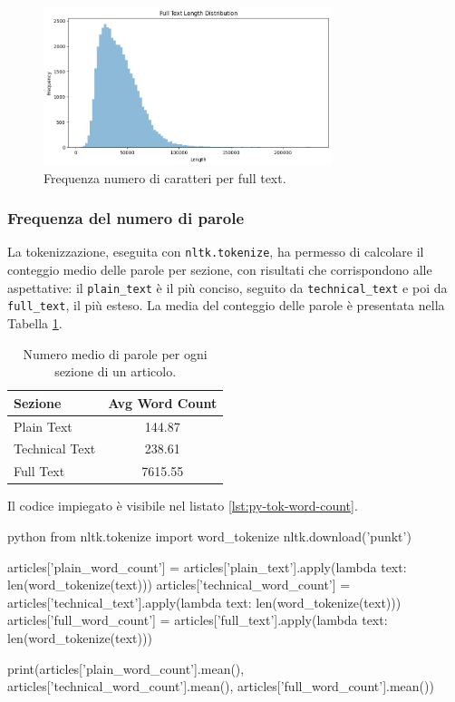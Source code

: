 \documentclass[12pt,a4paper,twoside,openright]{book}
\begin{document}
\begin{figure}
    \centering
    \includegraphics[width=0.75\textwidth]{images/full_length_distrib.png}
    \caption{Frequenza numero di caratteri per full text.}
    \label{fig:hist_full}
\end{figure}


\subsubsection{Frequenza del numero di parole}
La tokenizzazione, eseguita con \texttt{nltk.tokenize}, ha permesso di calcolare il conteggio medio delle parole per sezione, con risultati che corrispondono alle aspettative: il \texttt{plain\_text} è il più conciso, seguito da \texttt{technical\_text} e poi da \texttt{full\_text}, il più esteso. La media del conteggio delle parole è presentata nella Tabella \ref{tab:avg_word_count}.

\begin{table}
\centering
\begin{tabular}{|l|c|}
\hline
Sezione         & Avg Word Count \\ \hline
Plain Text      & 144.87 \\ \hline
Technical Text  & 238.61 \\ \hline
Full Text       & 7615.55 \\ \hline
\end{tabular}
\caption{Numero medio di parole per ogni sezione di un articolo.}
\label{tab:avg_word_count}
\end{table}

Il codice impiegato è visibile nel listato \ref{lst:py-tok-word-count}.

\begin{customcode}   
\begin{mintedbox}{python}
from nltk.tokenize import word_tokenize
nltk.download('punkt')

articles['plain_word_count'] = articles['plain_text'].apply(lambda text: len(word_tokenize(text)))
articles['technical_word_count'] = articles['technical_text'].apply(lambda text: len(word_tokenize(text)))
articles['full_word_count'] = articles['full_text'].apply(lambda text: len(word_tokenize(text)))

print(articles['plain_word_count'].mean(),
       articles['technical_word_count'].mean(),
       articles['full_word_count'].mean())
\end{mintedbox}
\caption{Tokenizzazione delle istanze e calcolo dei valori medi.}
\label{lst:py-tok-word-count}
\end{customcode}
\end{document}
